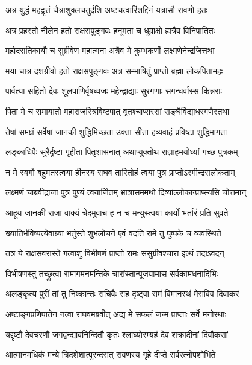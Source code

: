 \twolineshloka
{अत्र युद्धं महद्वृत्तं चैत्राशुक्लचतुर्दशि}
{अष्टचत्वारिंशद्दिनं यत्रासौ रावणो हतः}%

\twolineshloka
{अत्र प्रहस्तो नीलेन हतो राक्षसपुङ्गवः}
{हनूमता च धूम्राक्षो ह्यत्रैव विनिपातितः}%

\twolineshloka
{महोदरातिकायौ च सुग्रीवेण महात्मना}
{अत्रैव मे कुम्भकर्णो लक्ष्मणेनेन्द्रजित्तथा}%

\twolineshloka
{मया चात्र दशग्रीवो हतो राक्षसपुङ्गवः}
{अत्र सम्भाषितुं प्राप्तो ब्रह्मा लोकपितामहः}%

\twolineshloka
{पार्वत्या सहितो देवः शूलपाणिर्वृषध्वजः}
{महेन्द्राद्याः सुरगणाः सगन्धर्वास्स किन्नराः}%

\twolineshloka
{पिता मे च समायातो महाराजस्त्रिविष्टपात्}
{वृतश्चाप्सरसां सङ्घैर्विद्याधरगणैस्तथा}%

\twolineshloka
{तेषां समक्षं सर्वेषां जानकी शुद्धिमिच्छता}
{उक्ता सीता हव्यवाहं प्रविष्टा शुद्धिमागता}%

\twolineshloka
{लङ्काधिपैः सुरैर्दृष्टा गृहीता पितृशासनात्}
{अथाप्युक्तोथ राज्ञाहमयोध्यां गच्छ पुत्रकम्}%

\twolineshloka
{न मे स्वर्गो बहुमतस्त्वया हीनस्य राघव}
{तारितोहं त्वया पुत्र प्राप्तोऽस्मीन्द्रसलोकताम्}%

\twolineshloka
{लक्ष्मणं चाब्रवीद्राजा पुत्र पुण्यं त्वयार्जितम्}
{भ्रात्रासममथो दिव्यांल्लोकान्प्राप्स्यसि चोत्तमान्}%

\twolineshloka
{आहूय जानकीं राजा वाक्यं चेदमुवाच ह}
{न च मन्युस्त्वया कार्यो भर्तारं प्रति सुव्रते}%

\twolineshloka
{ख्यातिर्भविष्यत्येवाग्र्या भर्तुस्ते शुभलोचने}
{एवं वदति रामे तु पुष्पके च व्यवस्थिते}%

\twolineshloka
{तत्र ये राक्षसवरास्ते गत्वाशु विभीषणं}
{प्राप्तो रामः ससुग्रीवश्चारा इत्थं तदाऽवदन्}%

\twolineshloka
{विभीषणस्तु तच्छ्रुत्वा रामागमनमन्तिके}
{चारांस्तान्पूजयामास सर्वकामधनादिभिः}%

\twolineshloka
{अलङ्कृत्य पुरीं तां तु निष्क्रान्तः सचिवैः सह}
{दृष्ट्वा रामं विमानस्थं मेराविव दिवाकरं}%

\twolineshloka
{अष्टाङ्गप्रणिपातेन नत्वा राघवमब्रवीत्}
{अद्य मे सफलं जन्म प्राप्ताः सर्वे मनोरथाः}%

\twolineshloka
{यद्दृष्टौ देवचरणौ जगद्वन्द्यावनिन्दितौ}
{कृतः श्लाघ्योस्म्यहं देव शक्रादीनां दिवौकसां}%

\twolineshloka
{आत्मानमधिकं मन्ये त्रिदशेशात्पुरन्दरात्}
{रावणस्य गृहे दीप्ते सर्वरत्नोपशोभिते}%

